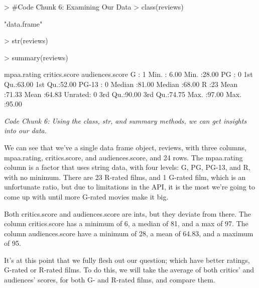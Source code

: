 \documentclass{article}
\begin{document}
\begin{Schunk}
\begin{Sinput}
> #Code Chunk 6: Examining Our Data
> class(reviews)
\end{Sinput}
\begin{Soutput}
[1] "data.frame"
\end{Soutput}
\begin{Sinput}
> str(reviews)
\end{Sinput}
\begin{Sinput}
> summary(reviews)
\end{Sinput}
\begin{Soutput}
  mpaa.rating critics.score   audiences.score
 G      : 1   Min.   : 6.00   Min.   :28.00  
 PG     : 0   1st Qu.:63.00   1st Qu.:52.00  
 PG-13  : 0   Median :81.00   Median :68.00  
 R      :23   Mean   :71.33   Mean   :64.83  
 Unrated: 0   3rd Qu.:90.00   3rd Qu.:74.75  
              Max.   :97.00   Max.   :95.00  
\end{Soutput}
\end{Schunk}
\emph{Code Chunk 6: Using the class, str, and summary methods, we can get insights into our data.}

We can see that we've a single data frame object, reviews, with three columns, mpaa.rating, critics.score, and audiences.score, and 24 rows. The mpaa.rating column is a factor that uses string data, with four levels: G, PG, PG-13, and R, with no minimum. There are 23 R-rated films, and 1 G-rated film, which is an unfortunate ratio, but due to limitations in the API, it is the most we're going to come up with until more G-rated movies make it big.

Both critics.score and audiences.score are ints, but they deviate from there. The column critics.score has a minimum of 6, a median of 81, and a max of 97. The column audiences.score have a minimum of 28, a mean of 64.83, and a maximum of 95. 

It's at this point that we fully flesh out our question; which have better ratings, G-rated or R-rated films. To do this, we will take the average of both critics' and audiences' scores, for both G- and R-rated films, and compare them.
\end{document}
